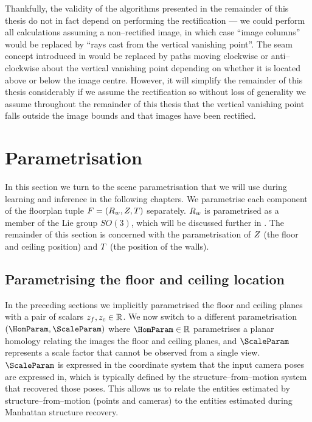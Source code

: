 Thankfully, the validity of the algorithms presented in the remainder
of this thesis do not in fact depend on performing the rectification
 --- we could perform all calculations assuming
a non--rectified image, in which case ``image columns'' would be
replaced by ``rays cast from the vertical vanishing point''. The seam
concept introduced in  would be replaced
by paths moving clockwise or anti--clockwise about the vertical
vanishing point depending on whether it is located above or below the
image centre\changedsinceviva. However, it will simplify the remainder
of this thesis considerably if we assume the rectification
 so without loss of generality we assume
throughout the remainder of this thesis that the vertical vanishing
point falls outside the image bounds and that images have been
rectified.

\section{Parametrisation}

In this section we turn to the scene parametrisation that we will use
during learning and inference in the following chapters. We
parametrise each component of the floorplan tuple
$\Floorplan=(\SceneR,\Zs,\Polyline)$ separately. $\SceneR$ is
parametrised as a member of the Lie group $SO(3)$, which will be
discussed further in . The remainder of this
section is concerned with the parametrisation of $\Zs$ (the floor and
ceiling position) and $\Polyline$ (the position of the walls).

\subsection{Parametrising the floor and ceiling location}

In the preceding sections we implicitly parametrised the floor and
ceiling planes with a pair of scalars $\zfloor,\zceil\in\Reals$. We
now switch to a different parametrisation $(\HomParam,\ScaleParam)$
where $\HomParam\in\Reals$ parametrises a planar homology relating the
images the floor and ceiling planes, and $\ScaleParam$ represents a
scale factor that cannot be observed from a single view. $\ScaleParam$
is expressed in the coordinate system that the input camera poses are
expressed in, which is typically defined by the
structure--from--motion system that recovered those poses. This allows
us to relate the entities estimated by structure--from--motion (points
and cameras) to the entities estimated during Manhattan structure
recovery.\changedsinceviva


